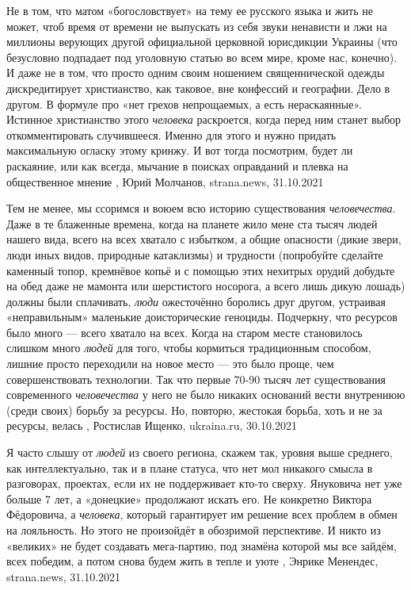 Не в том, что матом «богословствует» на тему ее русского языка и жить не может,
чтоб время от времени не выпускать из себя звуки ненависти и лжи на миллионы
верующих другой официальной церковной юрисдикции Украины (что безусловно
подпадает под уголовную статью во всем мире, кроме нас, конечно).  И даже не в
том, что просто одним своим ношением священнической одежды дискредитирует
христианство, как таковое, вне конфессий и географии.  Дело в другом. В формуле
про «нет грехов непрощаемых, а есть нераскаянные».  Истинное христианство этого
\emph{человека} раскроется, когда перед ним станет выбор откомментировать
случившееся. Именно для этого и нужно придать максимальную огласку этому
кринжу. И вот тогда посмотрим, будет ли раскаяние, или как всегда, мычание в
поисках оправданий и плевка на общественное мнение
, 
Юрий Молчанов, strana.news, 31.10.2021

Тем не менее, мы ссоримся и воюем всю историю существования
\emph{человечества}. Даже в те блаженные времена, когда на планете жило мене
ста тысяч людей нашего вида, всего на всех хватало с избытком, а общие
опасности (дикие звери, люди иных видов, природные катаклизмы) и трудности
(попробуйте сделайте каменный топор, кремнёвое копьё и с помощью этих нехитрых
орудий добудьте на обед даже не мамонта или шерстистого носорога, а всего лишь
дикую лошадь) должны были сплачивать, \emph{люди} ожесточённо боролись друг
другом, устраивая «неправильным» маленькие доисторические геноциды.  Подчеркну,
что ресурсов было много — всего хватало на всех. Когда на старом месте
становилось слишком много \emph{людей} для того, чтобы кормиться традиционным
способом, лишние просто переходили на новое место — это было проще, чем
совершенствовать технологии. Так что первые 70-90 тысяч лет существования
современного \emph{человечества} у него не было никаких оснований вести
внутреннюю (среди своих) борьбу за ресурсы. Но, повторю, жестокая борьба, хоть
и не за ресурсы, велась
, 
Ростислав Ищенко, ukraina.ru, 30.10.2021

Я часто слышу от \emph{людей} из своего региона, скажем так, уровня выше среднего, как
интеллектуально, так и в плане статуса, что нет мол никакого смысла в
разговорах, проектах, если их не поддерживает кто-то сверху.  Януковича нет уже
больше 7 лет, а «донецкие» продолжают искать его. Не конкретно Виктора
Фёдоровича, а \emph{человека}, который гарантирует им решение всех проблем в обмен на
лояльность. Но этого не произойдёт в обозримой перспективе. И никто из
«великих» не будет создавать мега-партию, под знамёна которой мы все зайдём,
всех победим, а потом снова будем жить в тепле и уюте
, 
Энрике Менендес, strana.news, 31.10.2021

